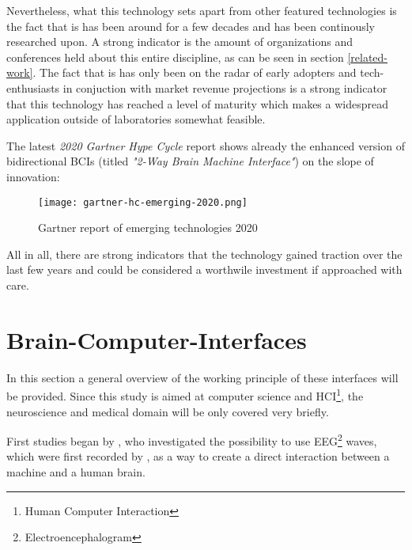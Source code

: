             Nevertheless, what this technology sets apart from other featured technologies is the fact that is has been around for a few decades and has been continously researched upon. A strong indicator is the amount of organizations and conferences held about this entire discipline, as can be seen in section \ref*{related-work}. The fact that is has only been on the radar of early adopters and tech-enthusiasts in conjuction with market revenue projections is a strong indicator that this technology has reached a level of maturity which makes a widespread application outside of laboratories somewhat feasible.

            The latest \textit{2020 Gartner Hype Cycle} report shows already the enhanced version of bidirectional BCIs (titled \textit{"2-Way Brain Machine Interface"}) on the slope of innovation:

            \begin{figure}[h]     %
                \centering
                \texttt{[image: gartner-hc-emerging-2020.png]} 
                \caption{Gartner report of emerging technologies 2020}\label{gartner-2020}
            \end{figure}

            All in all, there are strong indicators that the technology gained traction over the last few years and could be considered a worthwile investment if approached with care.

        \section{Brain-Computer-Interfaces}\label{intro-bci}

            In this section a general overview of the working principle of these interfaces will be provided. Since this study is aimed at computer science and HCI\footnote{Human Computer Interaction}, the neuroscience and medical domain will be only covered very briefly.

            First studies began by \cite{Vidal.1973}, who investigated the possibility to use EEG\footnote{Electroencephalogram} waves, which were first recorded by \cite{Berger.1929}, as a way to create a direct interaction between a machine and a human brain. 

